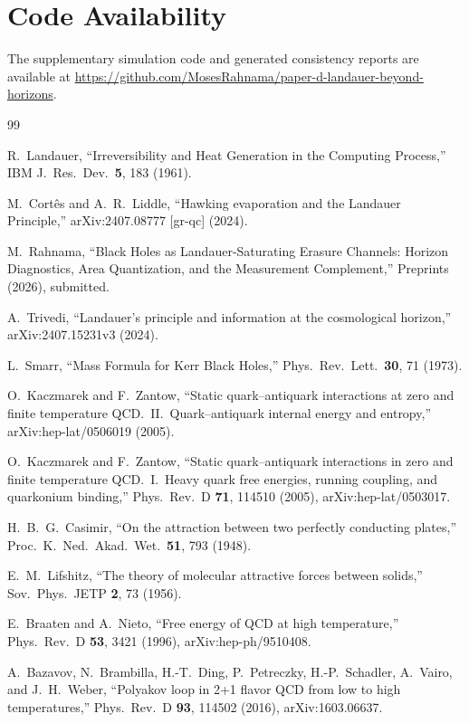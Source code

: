 \documentclass[%
 aip,
 amsmath,amssymb,
 reprint,%
]{revtex4-2}
\begin{document}
\section*{Code Availability}
The supplementary simulation code and generated consistency reports
are available at
\url{https://github.com/MosesRahnama/paper-d-landauer-beyond-horizons}.

\begin{thebibliography}{99}

R.~Landauer, ``Irreversibility and Heat Generation in the Computing
Process,''
IBM J.\ Res.\ Dev.\ \textbf{5}, 183 (1961).

M.~Cort\^es and A.~R.~Liddle, ``Hawking evaporation and the
Landauer Principle,''
arXiv:2407.08777 [gr-qc] (2024).

M.~Rahnama, ``Black Holes as Landauer-Saturating Erasure Channels:
Horizon Diagnostics, Area Quantization, and the Measurement
Complement,''
Preprints (2026), submitted.

A.~Trivedi, ``Landauer's principle and information at the
cosmological horizon,''
arXiv:2407.15231v3 (2024).

L.~Smarr, ``Mass Formula for Kerr Black Holes,''
Phys.\ Rev.\ Lett.\ \textbf{30}, 71 (1973).

O.~Kaczmarek and F.~Zantow, ``Static quark--antiquark interactions
at zero and finite temperature QCD.\ II.\ Quark--antiquark internal
energy and entropy,''
arXiv:hep-lat/0506019 (2005).

O.~Kaczmarek and F.~Zantow, ``Static quark--antiquark interactions
in zero and finite temperature QCD.\ I.\ Heavy quark free energies,
running coupling, and quarkonium binding,''
Phys.\ Rev.\ D \textbf{71}, 114510 (2005),
arXiv:hep-lat/0503017.

H.~B.~G.~Casimir, ``On the attraction between two perfectly
conducting plates,''
Proc.\ K.\ Ned.\ Akad.\ Wet.\ \textbf{51}, 793 (1948).

E.~M.~Lifshitz, ``The theory of molecular attractive forces between
solids,''
Sov.\ Phys.\ JETP \textbf{2}, 73 (1956).

E.~Braaten and A.~Nieto, ``Free energy of QCD at high temperature,''
Phys.\ Rev.\ D \textbf{53}, 3421 (1996),
arXiv:hep-ph/9510408.

A.~Bazavov, N.~Brambilla, H.-T.~Ding, P.~Petreczky,
H.-P.~Schadler, A.~Vairo, and J.~H.~Weber,
``Polyakov loop in 2+1 flavor QCD from low to high temperatures,''
Phys.\ Rev.\ D \textbf{93}, 114502 (2016),
arXiv:1603.06637.


\end{thebibliography}
\end{document}
